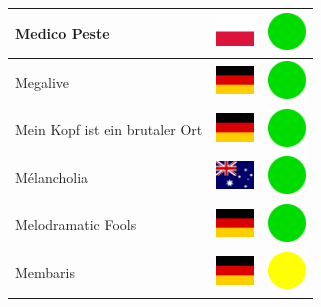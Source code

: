 \documentclass[12pt, a4paper, twoside]{report}
\begin{document}
\begin{center}
\begin{longtable}{|p{5cm}|p{2cm}|p{2cm}|}
 Medico Peste                                               & \includegraphics[width=1cm]{../4x3/pl} &   \includegraphics[width=1cm]{../likes/y} \\ \hline
 Megalive                                                   & \includegraphics[width=1cm]{../4x3/de} &   \includegraphics[width=1cm]{../likes/y} \\ \hline
 Mein Kopf ist ein brutaler Ort                             & \includegraphics[width=1cm]{../4x3/de} &   \includegraphics[width=1cm]{../likes/y} \\ \hline
 Mélancholia                                                & \includegraphics[width=1cm]{../4x3/au} &   \includegraphics[width=1cm]{../likes/y} \\ \hline
 Melodramatic Fools                                         & \includegraphics[width=1cm]{../4x3/de} &   \includegraphics[width=1cm]{../likes/y} \\ \hline
 Membaris                                                   & \includegraphics[width=1cm]{../4x3/de} &   \includegraphics[width=1cm]{../likes/m} \\ \hline

\end{longtable}
\end{center}
\end{document}
